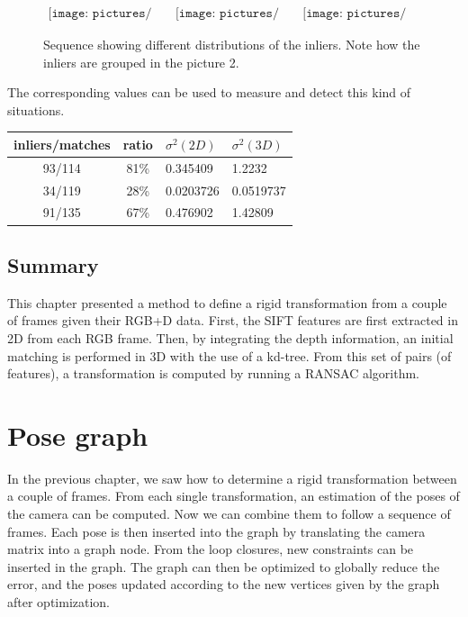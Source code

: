 \begin{figure}[h!]
\centering$
\begin{array}{cccc}
\texttt{[image: pictures/bad\_transform1]} &
\texttt{[image: pictures/bad\_transform2]} &
\texttt{[image: pictures/bad\_transform3]}
\end{array}$
\caption{Sequence showing different distributions of the inliers. Note how the inliers are grouped in the picture 2.}
\end{figure}

The corresponding values can be used to measure and detect this kind of situations.

\begin{tabular}{ccll}
inliers/matches & ratio & $\sigma^2(2D)$ & $\sigma^2(3D)$\\
\hline
93/114 &	81\% &	0.345409 &	1.2232\\
34/119 &	28\% &	0.0203726 &	0.0519737\\
91/135 &	67\% &	0.476902 &	1.42809\\
\end{tabular}

\section{Summary}

This chapter presented a method to define a rigid transformation from a couple of frames given their RGB+D data. First, the SIFT features are first extracted in 2D from each RGB frame. Then, by integrating the depth information, an initial matching is performed in 3D with the use of a kd-tree. From this set of pairs (of features), a transformation is computed by running a RANSAC algorithm.

\chapter{Pose graph}
\label{chap:graph}

In the previous chapter, we saw how to determine a rigid transformation between a couple of frames. From each single transformation, an estimation of the poses of the camera can be computed. Now we can combine them to follow a sequence of frames. Each pose is then inserted into the graph by translating the camera matrix into a graph node. From the loop closures, new constraints can be inserted in the graph. The graph can then be optimized to globally reduce the error, and the poses updated according to the new vertices given by the graph after optimization.

